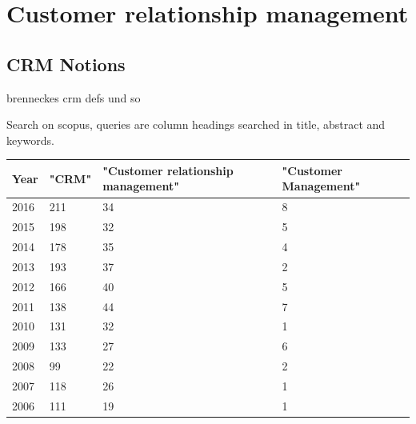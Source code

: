 \section{Customer relationship management}\label{sec:appendix01}

\subsection{CRM Notions}
\label{app:crm}
brenneckes crm defs und so 

Search on scopus, queries are column headings searched in title, abstract and keywords. 

\begin{table}[caption={CRM Publication Comparison}, label=tab:crmnotioncomparison]
	\centering

	\begin{tabular}{p{1cm}| p{2cm} |p{4.3cm}|p{3cm}   } 
		\textbf{Year} & \textbf{"CRM"} & \textbf{"Customer relationship management"} & \textbf{"Customer Management"} \\ \hline 
		2016          & 211            & 34                                          & 8                              \\
		2015          & 198            & 32                                          & 5                              \\
		2014          & 178            & 35                                          & 4                              \\
		2013          & 193            & 37                                          & 2                              \\
		2012          & 166            & 40                                          & 5                              \\
		2011          & 138            & 44                                          & 7                              \\
		2010          & 131            & 32                                          & 1                              \\
		2009          & 133            & 27                                          & 6                              \\
		2008          & 99             & 22                                          & 2                              \\
		2007          & 118            & 26                                          & 1                              \\
		2006 & 111          & 19                           & 1									 \\
	\end{tabular}
\end{table}

